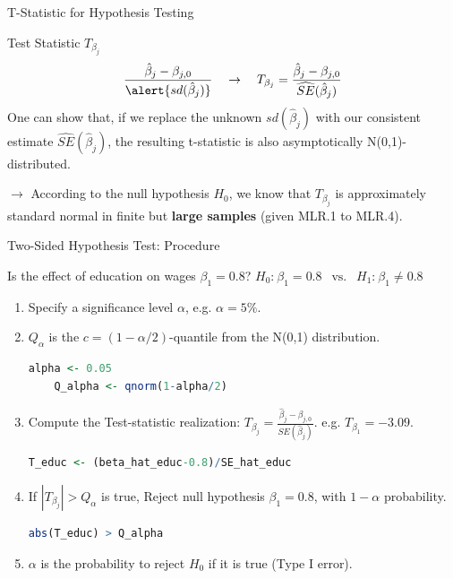 \documentclass[11pt, aspectratio = 169]{beamer}
\begin{document}
\begin{frame}{T-Statistic for Hypothesis Testing}
\begin{block}{Test Statistic $T_{\beta_j}$}
    \begin{align*}
    \frac{\hat{\beta}_j - \beta_{j,0}}{\alert{sd(\hat{\beta}_j)}} \quad \rightarrow \quad
    T_{\beta_j} = \frac{\hat{\beta}_j - \beta_{j,0}}{\widehat{SE}(\hat{\beta}_j)}
    \end{align*}
    One can show that, if we replace the \alert{unknown $sd(\hat{\beta}_j)$} with our consistent estimate $\widehat{SE}(\hat{\beta}_j)$, the resulting t-statistic is also asymptotically N(0,1)-distributed.
\end{block}
\pause
$\rightarrow$ According to the null hypothesis $H_0$, we know that $T_{\beta_j}$ is approximately standard normal in finite but \textbf{large samples} (given MLR.1 to MLR.4).

\end{frame}

\begin{frame}[fragile]{Two-Sided Hypothesis Test: Procedure}

Is the effect of education on wages $\beta_1 = 0.8$? \pause $H_{0}\text{:}\: \beta_1 = 0.8 \:\: \text{  vs.  } \:\: H_1\text{:}\: \beta_1 \neq 0.8$
\pause
\begin{enumerate}
    \item Specify a significance level $\alpha$, e.g. $\alpha = 5\%$.
    \item $Q_{\alpha}$ is the $c = (1-\alpha/2)$-quantile from the N(0,1) distribution.
    \begin{lstlisting}[language=R]
    alpha <- 0.05
    Q_alpha <- qnorm(1-alpha/2)
    \end{lstlisting}
    \pause
    \item Compute the Test-statistic realization: $T_{\beta_j} = \frac{\hat{\beta}_j - \beta_{j,0}}{\widehat{SE}(\hat{\beta}_j)}$. e.g. $T_{\beta_1} = -3.09$.
    \vspace{3mm}
    \begin{lstlisting}[language=R]
    T_educ <- (beta_hat_educ-0.8)/SE_hat_educ
    \end{lstlisting} \pause
    \item If $| T_{\beta_j} | > Q_{\alpha}$ is true, Reject null hypothesis $\beta_1 = 0.8$, with $1-\alpha$ probability.
    \vspace{3mm}
    \begin{lstlisting}[language=R]
    abs(T_educ) > Q_alpha
    \end{lstlisting} \pause
    \item[$\rightarrow$] $\alpha$ is the probability to reject $H_0$ if it is true (Type I error).
\end{enumerate}
\end{frame}
\end{document}
